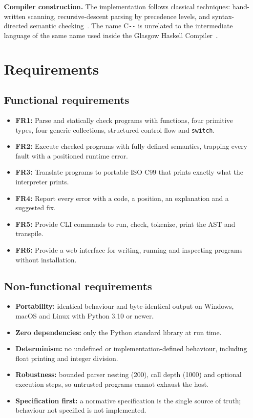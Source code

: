 \documentclass[conference]{IEEEtran}
\newcommand{\cmm}{C\texttt{-{}-}}
\begin{document}
\textbf{Compiler construction.} The implementation follows classical techniques: hand-written scanning,
recursive-descent parsing by precedence levels, and syntax-directed semantic checking~\cite{dragonbook}.
The name \cmm{} is unrelated to the intermediate language of the same name used inside the Glasgow Haskell
Compiler~\cite{cmm_ghc}.

\section{Requirements}\label{sec:req}
\subsection{Functional requirements}
\begin{itemize}
  \item \textbf{FR1:} Parse and statically check programs with functions, four primitive types, four generic
        collections, structured control flow and \texttt{switch}.
  \item \textbf{FR2:} Execute checked programs with fully defined semantics, trapping every fault with a
        positioned runtime error.
  \item \textbf{FR3:} Translate programs to portable ISO C99 that prints exactly what the interpreter prints.
  \item \textbf{FR4:} Report every error with a code, a position, an explanation and a suggested fix.
  \item \textbf{FR5:} Provide CLI commands to run, check, tokenize, print the AST and transpile.
  \item \textbf{FR6:} Provide a web interface for writing, running and inspecting programs without installation.
\end{itemize}

\subsection{Non-functional requirements}
\begin{itemize}
  \item \textbf{Portability:} identical behaviour and byte-identical output on Windows, macOS and Linux with
        Python 3.10 or newer.
  \item \textbf{Zero dependencies:} only the Python standard library at run time.
  \item \textbf{Determinism:} no undefined or implementation-defined behaviour, including float printing and
        integer division.
  \item \textbf{Robustness:} bounded parser nesting (200), call depth (1000) and optional execution steps,
        so untrusted programs cannot exhaust the host.
  \item \textbf{Specification first:} a normative specification is the single source of truth; behaviour not
        specified is not implemented.
\end{itemize}
\end{document}
